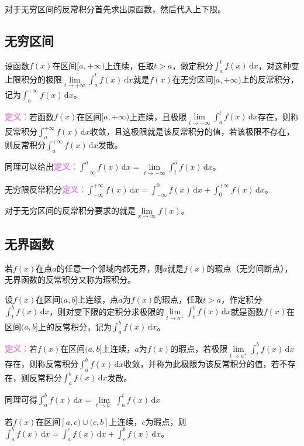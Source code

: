 \documentclass[UTF8, 12pt]{ctexart}
\begin{document}
对于无穷区间的反常积分首先求出原函数，然后代入上下限。

\subsection{无穷区间}

设函数$f(x)$在区间$[a,+\infty)$上连续，任取$t>a$，做定积分$\int_a^tf(x)\,\textrm{d}x$，对这种变上限积分的极限$\lim\limits_{t\to+\infty}\int_a^tf(x)\,\textrm{d}x$就是$f(x)$在无穷区间$[a,+\infty)$上的反常积分，记为$\int_a^{+\infty}f(x)\,\textrm{d}x$。

\textcolor{violet}{\textbf{定义：}}若函数$f(x)$在区间$[a,+\infty)$上连续，且极限$\lim\limits_{t\to+\infty}\int_a^tf(x)\,\textrm{d}x$存在，则称反常积分$\int_a^{+\infty}f(x)\,\textrm{d}x$收敛，且这极限就是该反常积分的值，若该极限不存在，则反常积分$\int_a^{+\infty}f(x)\,\textrm{d}x$发散。

同理可以给出\textcolor{violet}{\textbf{定义：}}$\int_{-\infty}^af(x)\,\textrm{d}x=\lim\limits_{t\to-\infty}\int_t^af(x)\,\textrm{d}x$。

无穷限反常积分\textcolor{violet}{\textbf{定义：}}$\int_{-\infty}^{+\infty}f(x)\,\textrm{d}x=\int_{-\infty}^0f(x)\,\textrm{d}x+\int_0^{+\infty}f(x)\,\textrm{d}x$。

对于无穷区间的反常积分要求的就是$\lim\limits_{x\to\infty}f(x)$。

\subsection{无界函数}

若$f(x)$在点$a$的任意一个邻域内都无界，则$a$就是$f(x)$的瑕点（无穷间断点），无界函数的反常积分又称为瑕积分。

设$f(x)$在区间$(a,b]$上连续，点$a$为$f(x)$的瑕点，任取$t>a$，作定积分$\int_t^bf(x)\,\textrm{d}x$，则对变下限的定积分求极限的$\lim\limits_{t\to a^+}\int_t^bf(x)\,\textrm{d}x$就是函数$f(x)$在区间$(a,b]$上的反常积分，记为$\int_a^bf(x)\,\textrm{d}x$。

\textcolor{violet}{\textbf{定义：}}若$f(x)$在区间$(a,b]$上连续，$a$为$f(x)$的瑕点，若极限$\lim\limits_{t\to a^+}\int_t^bf(x)\,\textrm{d}x$存在，则称反常积分$\int_a^bf(x)\,\textrm{d}x$收敛，并称为此极限为该反常积分的值，若不存在，则反常积分$\int_a^bf(x)\,\textrm{d}x$发散。

同理可得$\int_a^bf(x)\,\textrm{d}x=\lim\limits_{t\to b^-}\int_a^tf(x)\,\textrm{d}x$

若$f(x)$在区间$[a,c)\cup(c,b]$上连续，$c$为瑕点，则$\int_a^bf(x)\,\textrm{d}x=\int_a^cf(x)\,\textrm{d}x+\int_c^bf(x)\,\textrm{d}x$。
\end{document}
